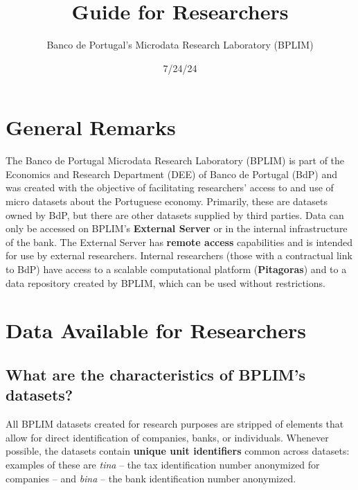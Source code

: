 \documentclass[
  a4paper,
  DIV=11,
  numbers=noendperiod]{scrartcl}
\title{Guide for Researchers}
\author{Banco de Portugal's Microdata Research Laboratory (BPLIM)}
\date{7/24/24}
\renewcommand*\contentsname{Table of contents}
\newcommand\contentsname{Table of contents}
\begin{document}
\maketitle
\ifdefined\Shaded\renewenvironment{Shaded}{\begin{tcolorbox}[borderline west={3pt}{0pt}{shadecolor}, breakable, enhanced, sharp corners, frame hidden, interior hidden, boxrule=0pt]}{\end{tcolorbox}}\fi

\renewcommand*\contentsname{Contents}
{
\hypersetup{linkcolor=}
\setcounter{tocdepth}{2}
\tableofcontents
}
\newpage{}

\hypertarget{general-remarks}{%
\section{General Remarks}\label{general-remarks}}

The Banco de Portugal Microdata Research Laboratory (BPLIM) is part of
the Economics and Research Department (DEE) of Banco de Portugal (BdP)
and was created with the objective of facilitating researchers' access
to and use of micro datasets about the Portuguese economy. Primarily,
these are datasets owned by BdP, but there are other datasets supplied
by third parties. Data can only be accessed on BPLIM's \textbf{External
Server} or in the internal infrastructure of the bank. The External
Server has \textbf{remote access} capabilities and is intended for use
by external researchers. Internal researchers (those with a contractual
link to BdP) have access to a scalable computational platform
(\textbf{Pitagoras}) and to a data repository created by BPLIM, which
can be used without restrictions.

\hypertarget{data-available-for-researchers}{%
\section{Data Available for
Researchers}\label{data-available-for-researchers}}

\hypertarget{what-are-the-characteristics-of-bplims-datasets}{%
\subsection{What are the characteristics of BPLIM's
datasets?}\label{what-are-the-characteristics-of-bplims-datasets}}

All BPLIM datasets created for research purposes are stripped of
elements that allow for direct identification of companies, banks, or
individuals. Whenever possible, the datasets contain \textbf{unique unit
identifiers} common across datasets: examples of these are \emph{tina}
-- the tax identification number anonymized for companies -- and
\emph{bina} -- the bank identification number anonymized.
\end{document}
